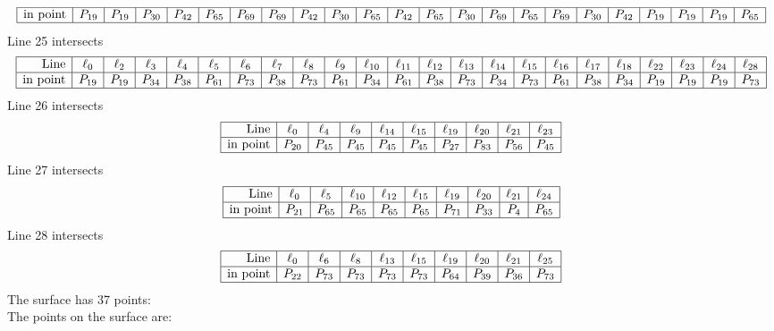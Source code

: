 \documentclass{article}
\begin{document}
{$$\begin{array}{|r*{22}{|c}|}
\hline
\mbox{in point}  & P_{19} & P_{19} & P_{30} & P_{42} & P_{65} & P_{69} & P_{69} & P_{42} & P_{30} & P_{65} & P_{42} & P_{65} & P_{30} & P_{69} & P_{65} & P_{69} & P_{30} & P_{42} & P_{19} & P_{19} & P_{19} & P_{65}\\
\hline
\end{array}
$$
Line 25 intersects 
$$
\begin{array}{|r*{22}{|c}|}
\hline
\mbox{Line}  & \ell_{0} & \ell_{2} & \ell_{3} & \ell_{4} & \ell_{5} & \ell_{6} & \ell_{7} & \ell_{8} & \ell_{9} & \ell_{10} & \ell_{11} & \ell_{12} & \ell_{13} & \ell_{14} & \ell_{15} & \ell_{16} & \ell_{17} & \ell_{18} & \ell_{22} & \ell_{23} & \ell_{24} & \ell_{28}\\
\hline
\mbox{in point}  & P_{19} & P_{19} & P_{34} & P_{38} & P_{61} & P_{73} & P_{38} & P_{73} & P_{61} & P_{34} & P_{61} & P_{38} & P_{73} & P_{34} & P_{73} & P_{61} & P_{38} & P_{34} & P_{19} & P_{19} & P_{19} & P_{73}\\
\hline
\end{array}
$$
Line 26 intersects 
$$
\begin{array}{|r*{9}{|c}|}
\hline
\mbox{Line}  & \ell_{0} & \ell_{4} & \ell_{9} & \ell_{14} & \ell_{15} & \ell_{19} & \ell_{20} & \ell_{21} & \ell_{23}\\
\hline
\mbox{in point}  & P_{20} & P_{45} & P_{45} & P_{45} & P_{45} & P_{27} & P_{83} & P_{56} & P_{45}\\
\hline
\end{array}
$$
Line 27 intersects 
$$
\begin{array}{|r*{9}{|c}|}
\hline
\mbox{Line}  & \ell_{0} & \ell_{5} & \ell_{10} & \ell_{12} & \ell_{15} & \ell_{19} & \ell_{20} & \ell_{21} & \ell_{24}\\
\hline
\mbox{in point}  & P_{21} & P_{65} & P_{65} & P_{65} & P_{65} & P_{71} & P_{33} & P_{4} & P_{65}\\
\hline
\end{array}
$$
Line 28 intersects 
$$
\begin{array}{|r*{9}{|c}|}
\hline
\mbox{Line}  & \ell_{0} & \ell_{6} & \ell_{8} & \ell_{13} & \ell_{15} & \ell_{19} & \ell_{20} & \ell_{21} & \ell_{25}\\
\hline
\mbox{in point}  & P_{22} & P_{73} & P_{73} & P_{73} & P_{73} & P_{64} & P_{39} & P_{36} & P_{73}\\
\hline
\end{array}
$$
The surface has 37 points:\\
The points on the surface are:\\
}
\end{document}
